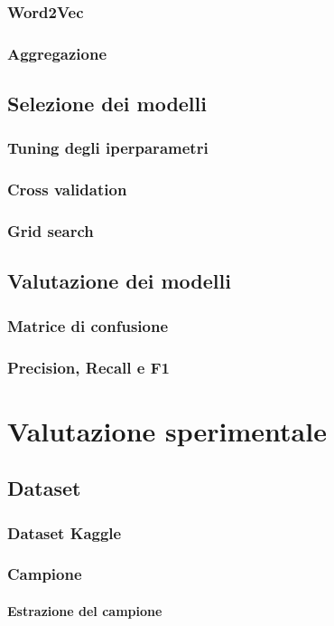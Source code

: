 \documentclass[12pt]{report}
\theoremstyle{definition}
\begin{document}
\subsection{Word2Vec}
\subsection{Aggregazione}
\section{Selezione dei modelli}\label{modelselection}
\subsection{Tuning degli iperparametri}
\subsection{Cross validation}
\subsection{Grid search}
\section{Valutazione dei modelli}\label{evaluation}
\subsection{Matrice di confusione}
\subsection{Precision, Recall e F1}

\chapter{Valutazione sperimentale}
\label{Capitolo 4}
\onehalfspacing
\section{Dataset}
\subsection{Dataset Kaggle}
\subsection{Campione}
\subsubsection{Estrazione del campione}
\end{document}
